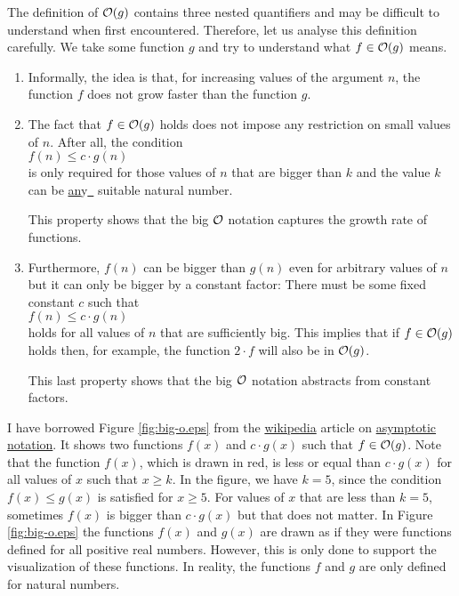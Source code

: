 The definition of $\mathcal{O}(g)$ contains three nested quantifiers and may be difficult to understand
when first encountered.  Therefore, let us analyse this definition carefully.  We take some
function $g$ and try to understand what $f \in \mathcal{O}(g)$ means.
\begin{enumerate}
\item Informally, the idea is that, for increasing values of the argument $n$, the function $f$
      does not grow faster than the function $g$. 
\item The fact that $f \in \mathcal{O}(g)$ holds does not impose any restriction on small values of $n$.
      After all, the condition
      \\[0.2cm]
      \hspace*{1.3cm}
      $f(n) \leq c \cdot g(n)$
      \\[0.2cm]
      is only required for those values of $n$ that are bigger than $k$ and the value
      $k$ can be \underline{an}y\hspace*{-0.1cm}\underline{\ } suitable natural number.

      This property shows that the big $\mathcal{O}$ notation captures the growth rate of functions.
\item Furthermore, $f(n)$ can be bigger than $g(n)$ even for arbitrary values of $n$ 
      but it can only be bigger by a constant factor:  There must be some fixed constant $c$
      such that 
      \\[0.2cm]
      \hspace*{1.3cm}
      $f(n) \leq c \cdot g(n)$
      \\[0.2cm]
      holds for all values of $n$ that are sufficiently big.  This implies that if $f \in \mathcal{O}(g)$
      holds then, for example, the function $2 \cdot f$ will also be in $\mathcal{O}(g)$.

      This last property shows that the big $\mathcal{O}$ notation abstracts from constant factors.
\end{enumerate}
I have borrowed Figure \ref{fig:big-o.eps} from the \href{http://www.wikipedia.org}{wikipedia} article on 
\href{http://en.wikipedia.org/wiki/Asymptotic_notation}{asymptotic notation}.  It shows two functions 
$f(x)$ and $c \cdot g(x)$ such that $f \in \mathcal{O}(g)$.  Note that the function $f(x)$, which is drawn
in red, is less or equal than $c \cdot g(x)$ for all values of $x$ such that $x \geq k$.  In the
figure, we have $k=5$, since the condition $f(x) \leq g(x)$ is satisfied for $x \geq 5$. For
values of $x$ that are less than $k = 5$, sometimes $f(x)$ is bigger than $c \cdot g(x)$ but that does
not matter.  In Figure \ref{fig:big-o.eps} the functions $f(x)$ and $g(x)$ are drawn as if they were
functions defined for all positive real numbers.  However, this is only done to support the
visualization of these functions.  In reality, the functions $f$ and $g$ are only defined for
natural numbers.


